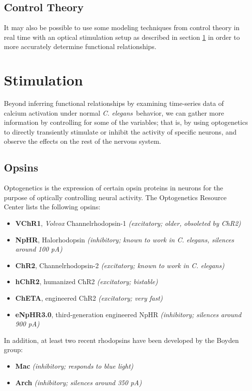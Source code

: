 \documentclass[letter,11pt]{article}
\newcommand{\cel}{{\em C. elegans}}
\begin{document}

\subsection{Control Theory}

It may also be possible to use some modeling techniques from control theory in
real time with an optical stimulation setup as described in section \ref{stimulation}
in order to more accurately determine functional relationships.


\section{Stimulation}
\label{stimulation}


Beyond inferring functional relationships by examining time-series data of calcium activation
under normal \cel\ behavior, we can gather more information by controlling for some of the
variables; that is, by using optogenetics to directly transiently stimulate or inhibit the
activity of specific neurons, and observe the effects on the rest of the nervous system.

\subsection{Opsins}

Optogenetics is the expression of certain opsin proteins in neurons for the purpose of optically
controlling neural activity. The Optogenetics Resource Center lists the following opsins:
\begin{itemize}
  \item \textbf{VChR1}, {\em Volvox} Channelrhodopsin-1 {\em (excitatory; older, obsoleted by ChR2)}
  \item \textbf{NpHR}, Halorhodopsin {\em (inhibitory; known to work in \cel, silences around 100 pA)}
  \item \textbf{ChR2}, Channelrhodopsin-2 {\em (excitatory; known to work in \cel)}
  \item \textbf{hChR2}, humanized ChR2 {\em (excitatory; bistable)}
  \item \textbf{ChETA}, engineered ChR2 {\em (excitatory; very fast)}
  \item \textbf{eNpHR3.0}, third-generation engineered NpHR {\em (inhibitory; silences around 900 pA)}
\end{itemize}
In addition, at least two recent rhodopsins have been developed by the Boyden group:
\begin{itemize}
  \item \textbf{Mac} {\em (inhibitory; responds to blue light)}
  \item \textbf{Arch} {\em (inhibitory; silences around 350 pA)}
\end{itemize}
\end{document}
